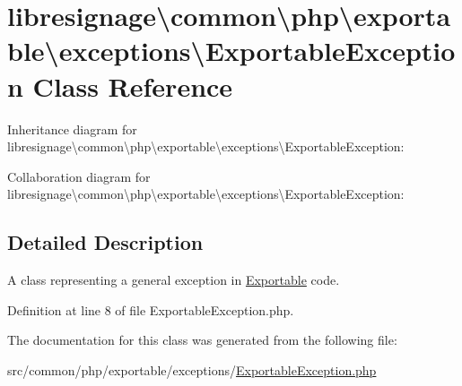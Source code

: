 \hypertarget{classlibresignage_1_1common_1_1php_1_1exportable_1_1exceptions_1_1ExportableException}{}\section{libresignage\textbackslash{}common\textbackslash{}php\textbackslash{}exportable\textbackslash{}exceptions\textbackslash{}Exportable\+Exception Class Reference}
\label{classlibresignage_1_1common_1_1php_1_1exportable_1_1exceptions_1_1ExportableException}


Inheritance diagram for libresignage\textbackslash{}common\textbackslash{}php\textbackslash{}exportable\textbackslash{}exceptions\textbackslash{}Exportable\+Exception\+:


Collaboration diagram for libresignage\textbackslash{}common\textbackslash{}php\textbackslash{}exportable\textbackslash{}exceptions\textbackslash{}Exportable\+Exception\+:


\subsection{Detailed Description}
A class representing a general exception in \hyperlink{classlibresignage_1_1common_1_1php_1_1exportable_1_1Exportable}{Exportable} code. 

Definition at line 8 of file Exportable\+Exception.\+php.



The documentation for this class was generated from the following file\+:\begin{DoxyCompactItemize}
\item 
src/common/php/exportable/exceptions/\hyperlink{ExportableException_8php}{Exportable\+Exception.\+php}\end{DoxyCompactItemize}
